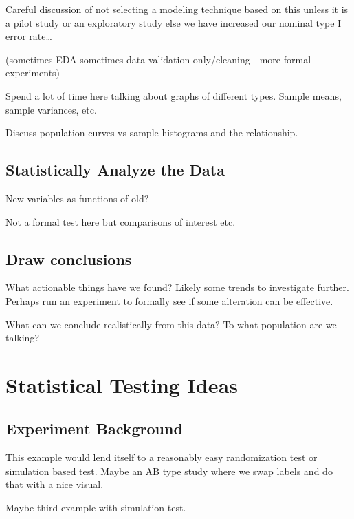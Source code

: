 \documentclass[
]{book}
\theoremstyle{definition}
\theoremstyle{definition}
\theoremstyle{definition}
\theoremstyle{remark}
\begin{document}
Careful discussion of not selecting a modeling technique based on this unless it is a pilot study or an exploratory study else we have increased our nominal type I error rate\ldots{}

(sometimes EDA sometimes data validation only/cleaning - more formal experiments)

Spend a lot of time here talking about graphs of different types. Sample means, sample variances, etc.

Discuss population curves vs sample histograms and the relationship.

\hypertarget{statistically-analyze-the-data}{%
\subsection{Statistically Analyze the Data}\label{statistically-analyze-the-data}}

New variables as functions of old?

Not a formal test here but comparisons of interest etc.

\hypertarget{draw-conclusions}{%
\subsection{Draw conclusions}\label{draw-conclusions}}

What actionable things have we found? Likely some trends to investigate further. Perhaps run an experiment to formally see if some alteration can be effective.

What can we conclude realistically from this data? To what population are we talking?

\hypertarget{statistical-testing-ideas}{%
\section{Statistical Testing Ideas}\label{statistical-testing-ideas}}

\hypertarget{experiment-background-1}{%
\subsection{Experiment Background}\label{experiment-background-1}}

This example would lend itself to a reasonably easy randomization test or simulation based test. Maybe an AB type study where we swap labels and do that with a nice visual.

Maybe third example with simulation test.
\end{document}
